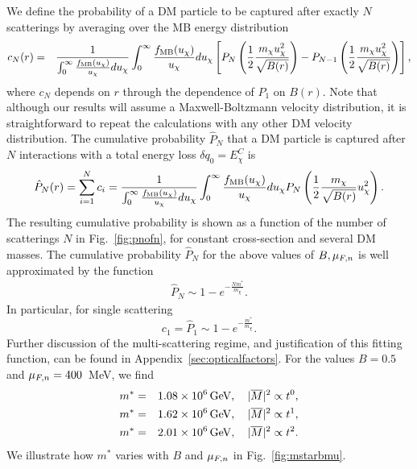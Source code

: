 We  define the probability of a DM particle to be captured after exactly $N$ scatterings by averaging over the MB energy distribution   
\begin{eqnarray}
c_N(r) &=& \frac{1}{\int_0^\infty \frac{f_{\rm MB}(u_\chi)}{u_\chi}du_\chi}\int_0^\infty \frac{f_{\rm MB}(u_\chi)}{u_\chi}du_\chi \left[P_N\left(\frac{1}{2}\frac{m_\chi u_\chi^2}{\sqrt{B(r)}}\right)-P_{N-1}\left(\frac{1}{2}\frac{m_\chi u_\chi^2}{\sqrt{B(r)}}\right)\right], 
\end{eqnarray}
where $c_N$ depends on $r$ through the dependence  of $P_1$  on $B(r)$. Note that although our results will assume a Maxwell-Boltzmann velocity distribution, it is straightforward to repeat the calculations with any other DM velocity distribution. The cumulative probability 
 $\hat{P}_N$ that a DM particle is captured after $N$ interactions with a total energy loss  $\delta q_0=E_\chi^C$ is 
\begin{eqnarray}
\hat{P}_N(r) = \sum_{i=1}^N c_i = \frac{1}{\int_0^\infty \frac{f_{\rm MB}(u_\chi)}{u_\chi}du_\chi}\int_0^\infty \frac{f_{\rm MB}(u_\chi)}{u_\chi}du_\chi P_N\left(\frac{1}{2}\frac{m_\chi}{\sqrt{B(r)}} u_\chi^2\right).
\end{eqnarray}
%
The resulting cumulative probability is shown as a function of the number of scatterings $N$ in Fig.~\ref{fig:pnofn}, for constant cross-section and several DM masses. 
The cumulative probability $\hat{P}_N$ for the above values of $B,\mu_{F,n}$ is well approximated by the function
\begin{eqnarray}
\hat{P}_N \sim  1-e^{-\frac{N m^*}{m_\chi}}.\label{eq:pncum}
\end{eqnarray}
In particular, for single scattering
\begin{equation}
c_1=\hat{P}_1 \sim  1-e^{-\frac{m^*}{m_\chi}}.\label{eq:c1}
\end{equation}
Further discussion of the multi-scattering regime, and justification of this fitting function, can be found in Appendix~\ref{sec:opticalfactors}.
For the values $B=0.5$ and $\mu_{F,n}=400$~MeV, we find
\begin{eqnarray}
m^{*} &=&1.08 \times 10^6 {\rm \,GeV},\quad |\overline{M}|^2\propto t^0,\\
m^{*} &=&1.62 \times 10^6 {\rm \,GeV},\quad |\overline{M}|^2\propto t^1,\\
m^{*} &=&2.01 \times 10^6 {\rm \,GeV},\quad |\overline{M}|^2\propto t^2.
\end{eqnarray}
We illustrate how $m^*$ varies with $B$ and $\mu_{F,n}$ in Fig.~\ref{fig:mstarbmu}.


